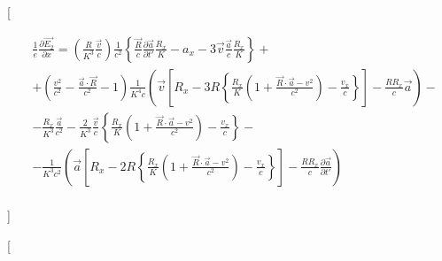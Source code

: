 \documentclass[11pt]{article}
\begin{document}
{[}

\begin{align}
  & \frac{1}{e}\frac{\partial \overrightarrow{{{E}_{2}}}}{\partial x}=\left( \frac{R}{{{K}^{3}}}\frac{\overrightarrow{v}}{c} \right)\frac{1}{{{c}^{2}}}\left\{ \frac{\overrightarrow{R}}{c}\frac{\partial \overrightarrow{a}}{\partial t'}\frac{{{R}_{x}}}{K}-{{a}_{x}}-3\overrightarrow{v}\frac{\overrightarrow{a}}{c}\frac{{{R}_{x}}}{K} \right\}+ \\ 
 & +\left( \frac{{{v}^{2}}}{{{c}^{2}}}-\frac{\overrightarrow{a}\cdot \overrightarrow{R}}{{{c}^{2}}}-1 \right)\frac{1}{{{K}^{4}}c}\left( \overrightarrow{v}\left[ {{R}_{x}}-3R\left\{ \frac{{{R}_{x}}}{K}\left( 1+\frac{\overrightarrow{R}\cdot \overrightarrow{a}-{{v}^{2}}}{{{c}^{2}}} \right)-\frac{{{v}_{x}}}{c} \right\} \right]-\frac{R{{R}_{x}}}{c}\overrightarrow{a} \right)- \\ 
 & -\frac{{{R}_{x}}}{{{K}^{3}}}\frac{\overrightarrow{a}}{{{c}^{2}}}-\frac{2}{{{K}^{3}}}\frac{\overrightarrow{v}}{c}\left\{ \frac{{{R}_{x}}}{K}\left( 1+\frac{\overrightarrow{R}\cdot \overrightarrow{a}-{{v}^{2}}}{{{c}^{2}}} \right)-\frac{{{v}_{x}}}{c} \right\}- \\ 
 & -\frac{1}{{{K}^{3}}{{c}^{2}}}\left( \overrightarrow{a}\left[ {{R}_{x}}-2R\left\{ \frac{{{R}_{x}}}{K}\left( 1+\frac{\overrightarrow{R}\cdot \overrightarrow{a}-{{v}^{2}}}{{{c}^{2}}} \right)-\frac{{{v}_{x}}}{c} \right\} \right]-\frac{R{{R}_{x}}}{c}\frac{\partial \overrightarrow{a}}{\partial t'} \right) \\ 
\end{align}

{]}

{[}
\end{document}
